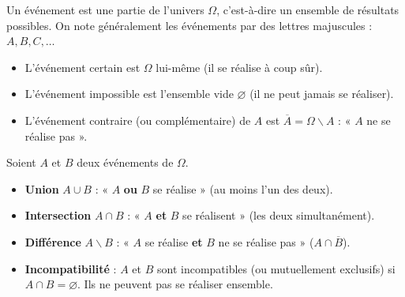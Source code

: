 \documentclass[11pt]{article}
\newcommand{\cle}[1]{{\popxbold\color{popdark}#1}}
\def\setminus{\mathbin{\backslash}}\let\smallsetminus\setminus
\begin{document}
\begin{definition}[Événement]
Un \cle{événement} est une partie de l'univers $\Omega$, c'est-à-dire un ensemble de résultats possibles. On note généralement les événements par des lettres majuscules : $A, B, C, \dots$
\begin{itemize}
    \item L'événement \cle{certain} est $\Omega$ lui-même (il se réalise à coup sûr).
    \item L'événement \cle{impossible} est l'ensemble vide $\varnothing$ (il ne peut jamais se réaliser).
    \item L'événement \cle{contraire} (ou complémentaire) de $A$ est $\overline{A} = \Omega \setminus A$ : « $A$ ne se réalise pas ».
\end{itemize}
\end{definition}

\begin{propriete}
Soient $A$ et $B$ deux événements de $\Omega$.
\begin{itemize}
    \item \textbf{Union} $A \cup B$ : « $A$ \textbf{ou} $B$ se réalise » (au moins l'un des deux).
    \item \textbf{Intersection} $A \cap B$ : « $A$ \textbf{et} $B$ se réalisent » (les deux simultanément).
    \item \textbf{Différence} $A \setminus B$ : « $A$ se réalise \textbf{et} $B$ ne se réalise pas » ($A \cap \overline{B}$).
    \item \textbf{Incompatibilité} : $A$ et $B$ sont \cle{incompatibles} (ou mutuellement exclusifs) si $A \cap B = \varnothing$. Ils ne peuvent pas se réaliser ensemble.
\end{itemize}
\end{propriete}
\end{document}
